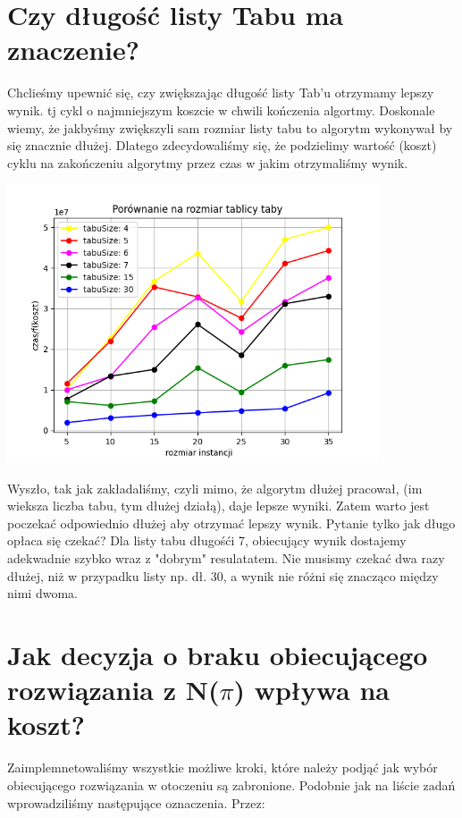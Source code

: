 \documentclass{article}
\begin{document}
    \section{Czy długość listy Tabu ma znaczenie? }

    Chclieśmy upewnić się, czy zwiększając długość listy
    Tab'u otrzymamy lepszy wynik. tj cykl o najmniejszym koszcie
    w chwili kończenia algortmy. Doskonale wiemy, że jakbyśmy
    zwiększyli sam rozmiar listy tabu to algorytm wykonywał by
    się znacznie dłużej. Dlatego zdecydowaliśmy się, że podzielimy
    wartość (koszt) cyklu na zakończeniu algorytmy przez czas w jakim
    otrzymaliśmy wynik.

    \includegraphics[width=11cm]{./spr2img/Figure_12.png}

    Wyszło, tak jak zakładaliśmy, czyli mimo, że algorytm dłużej
    pracował, (im wieksza liczba tabu, tym dłużej działą), daje lepsze
    wyniki. Zatem warto jest poczekać odpowiednio dłużej aby otrzymać
    lepszy wynik. Pytanie tylko jak długo opłaca się czekać?
    Dla listy tabu długośći 7, obiecujący wynik dostajemy adekwadnie szybko wraz
    z "dobrym" resulatatem. Nie musismy czekać dwa razy dłużej, niż w przypadku
    listy np. dł. 30, a wynik nie różni się znacząco między nimi dwoma.

    \section{Jak decyzja o braku obiecującego rozwiązania z N($\pi$)
            wpływa na koszt?}

    Zaimplemnetowaliśmy wszystkie możliwe kroki, które należy podjąć
    jak wybór obiecującego rozwiązania w otoczeniu są zabronione. Podobnie
    jak na liście zadań wprowadziliśmy następujące oznaczenia. Przez:
\end{document}
